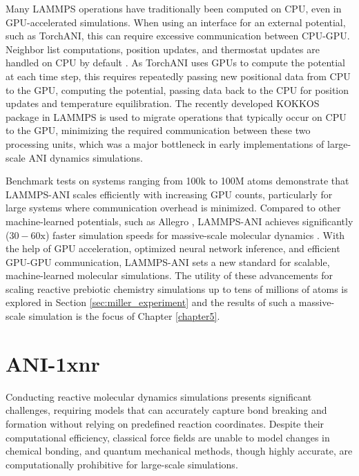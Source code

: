 Many LAMMPS operations have traditionally been computed on CPU, even in GPU-accelerated simulations.
When using an interface for an external potential, such as TorchANI, this can require excessive communication between CPU-GPU.
Neighbor list computations, position updates, and thermostat updates are handled on CPU by default \cite{lammps, lammps_ani}.
As TorchANI uses GPUs to compute the potential at each time step, this requires repeatedly passing new positional data from CPU to the GPU, computing the potential, passing data back to the CPU for position updates and temperature equilibration. 
The recently developed KOKKOS \cite{kokkos} package in LAMMPS \cite{kokkos_exascale} is used to migrate operations that typically occur on CPU to the GPU, minimizing the required communication between these two processing units, which was a major bottleneck in early implementations of large-scale ANI dynamics simulations.

Benchmark tests on systems ranging from 100k to 100M atoms \cite{lammps_ani} demonstrate that LAMMPS-ANI scales efficiently with increasing GPU counts, particularly for large systems where communication overhead is minimized. 
Compared to other machine-learned potentials, such as Allegro \cite{allegro}, LAMMPS-ANI achieves significantly ($30-60\text{x}$) faster simulation speeds for massive-scale molecular dynamics \cite{lammps_ani}. 
With the help of GPU acceleration, optimized neural network inference, and efficient GPU-GPU communication, LAMMPS-ANI sets a new standard for scalable, machine-learned molecular simulations.
The utility of these advancements for scaling reactive prebiotic chemistry simulations up to tens of millions of atoms is explored in Section \ref{sec:miller_experiment} and the results of such a massive-scale simulation is the focus of Chapter \ref{chapter5}.

\section{ANI-1xnr}
\label{sec:ani-1xnr}

Conducting reactive molecular dynamics simulations presents significant challenges, requiring models that can accurately capture bond breaking and formation without relying on predefined reaction coordinates. 
Despite their computational efficiency, classical force fields are unable to model changes in chemical bonding, and quantum mechanical methods, though highly accurate, are computationally prohibitive for large-scale simulations. 

